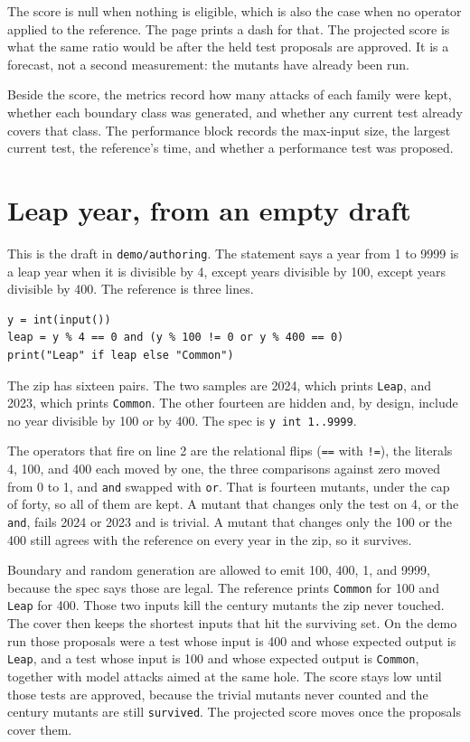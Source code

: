 \documentclass[10pt,a4paper]{article}
\begin{document}
The score is null when nothing is eligible, which is also the case when no operator applied to the reference. The page prints a dash for that. The projected score is what the same ratio would be after the held test proposals are approved. It is a forecast, not a second measurement: the mutants have already been run.

Beside the score, the metrics record how many attacks of each family were kept, whether each boundary class was generated, and whether any current test already covers that class. The performance block records the max-input size, the largest current test, the reference's time, and whether a performance test was proposed.

\section{Leap year, from an empty draft}

This is the draft in \texttt{demo/authoring}. The statement says a year from 1 to 9999 is a leap year when it is divisible by 4, except years divisible by 100, except years divisible by 400. The reference is three lines.

\begin{lstlisting}
y = int(input())
leap = y % 4 == 0 and (y % 100 != 0 or y % 400 == 0)
print("Leap" if leap else "Common")
\end{lstlisting}

The zip has sixteen pairs. The two samples are 2024, which prints \texttt{Leap}, and 2023, which prints \texttt{Common}. The other fourteen are hidden and, by design, include no year divisible by 100 or by 400. The spec is \texttt{y int 1..9999}.

The operators that fire on line 2 are the relational flips (\texttt{==} with \texttt{!=}), the literals 4, 100, and 400 each moved by one, the three comparisons against zero moved from 0 to 1, and \texttt{and} swapped with \texttt{or}. That is fourteen mutants, under the cap of forty, so all of them are kept. A mutant that changes only the test on 4, or the \texttt{and}, fails 2024 or 2023 and is trivial. A mutant that changes only the 100 or the 400 still agrees with the reference on every year in the zip, so it survives.

Boundary and random generation are allowed to emit 100, 400, 1, and 9999, because the spec says those are legal. The reference prints \texttt{Common} for 100 and \texttt{Leap} for 400. Those two inputs kill the century mutants the zip never touched. The cover then keeps the shortest inputs that hit the surviving set. On the demo run those proposals were a test whose input is 400 and whose expected output is \texttt{Leap}, and a test whose input is 100 and whose expected output is \texttt{Common}, together with model attacks aimed at the same hole. The score stays low until those tests are approved, because the trivial mutants never counted and the century mutants are still \texttt{survived}. The projected score moves once the proposals cover them.
\end{document}
